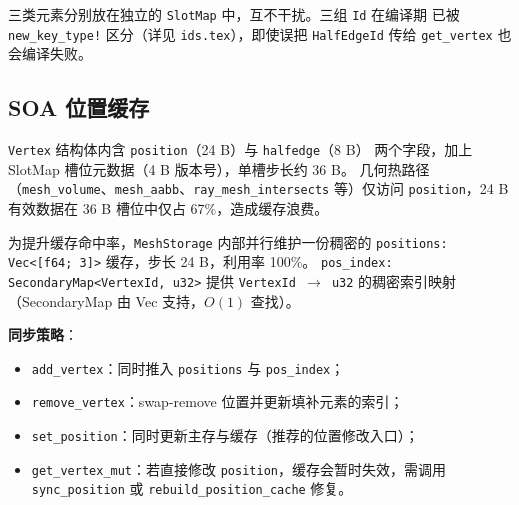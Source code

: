 \documentclass[11pt,a4paper]{article}
\begin{document}
三类元素分别放在独立的 \texttt{SlotMap} 中，互不干扰。三组 \texttt{Id} 在编译期
已被 \texttt{new\_key\_type!} 区分（详见 \texttt{ids.tex}），即使误把
\texttt{HalfEdgeId} 传给 \texttt{get\_vertex} 也会编译失败。

\subsection{SOA 位置缓存}

\texttt{Vertex} 结构体内含 \texttt{position}（24 B）与 \texttt{halfedge}（8 B）
两个字段，加上 SlotMap 槽位元数据（4 B 版本号），单槽步长约 36 B。
几何热路径（\texttt{mesh\_volume}、\texttt{mesh\_aabb}、\texttt{ray\_mesh\_intersects}
等）仅访问 \texttt{position}，24 B 有效数据在 36 B 槽位中仅占 67\%，造成缓存浪费。

为提升缓存命中率，\texttt{MeshStorage} 内部并行维护一份稠密的
\texttt{positions: Vec<[f64; 3]>} 缓存，步长 24 B，利用率 100\%。
\texttt{pos\_index: SecondaryMap<VertexId, u32>} 提供
\texttt{VertexId $\to$ u32} 的稠密索引映射（SecondaryMap 由 Vec 支持，$O(1)$ 查找）。

\begin{center}
\end{center}

\textbf{同步策略}：
\begin{sloppypar}
\begin{itemize}
  \item \texttt{add\_vertex}：同时推入 \texttt{positions} 与 \texttt{pos\_index}；
  \item \texttt{remove\_vertex}：swap-remove 位置并更新填补元素的索引；
  \item \texttt{set\_position}：同时更新主存与缓存（推荐的位置修改入口）；
  \item \texttt{get\_vertex\_mut}：若直接修改 \texttt{position}，缓存会暂时失效，需调用 \texttt{sync\_position} 或 \texttt{rebuild\_position\_cache} 修复。
\end{itemize}
\end{sloppypar}
\end{document}
